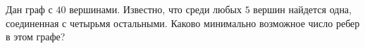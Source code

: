 \documentclass{article}
\begin{document}
Дан граф с $40$ вершинами. Известно, что среди любых $5$ вершин найдется одна, соединенная с четырьмя остальными. Каково минимально возможное число ребер в этом графе?
\end{document}
